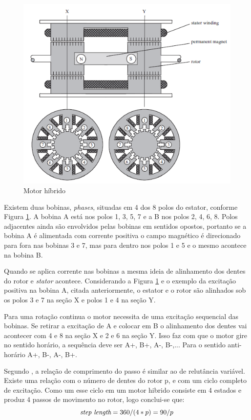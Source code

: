 \begin{figure}[htp]
	\centering
	\includegraphics[scale=0.7]{images/hibrido.png}
	\caption{Motor híbrido}	
	\label{fig:hibrido}	
\end{figure}

Existem duas bobinas, \emph{phases}, situadas em 4 dos 8 polos do estator, conforme Figura \ref{fig:hibrido}. A bobina A está nos polos 1, 3, 5, 7 e a B nos polos 2, 4, 6, 8. Polos adjacentes ainda são envolvidos pelas bobinas em sentidos opostos, portanto se a bobina A é alimentada com corrente positiva o campo magnético é direcionado para fora nas bobinas 3 e 7, mas para dentro nos polos 1 e 5 e o mesmo acontece na bobina B.

Quando se aplica corrente nas bobinas a mesma ideia de alinhamento dos dentes do rotor e \emph{stator} acontece. Considerando a Figura \ref{fig:hibrido} e o exemplo da excitação positiva na bobina A, citada anteriormente, o estator e o rotor são alinhados sob os polos 3 e 7 na seção X e polos 1 e 4 na seção Y.

Para uma rotação continua o motor necessita de uma excitação sequencial das bobinas. Se retirar a excitação de A e colocar em B o alinhamento dos dentes vai acontecer com 4 e 8 na seção X e 2 e 6 na seção Y. Isso faz com que o motor gire no sentido horário, a sequência deve ser A+, B+, A-, B-,... Para o sentido anti-horário A+, B-, A-, B+.

Segundo \cite{acarnley2002stepping}, a relação de comprimento do passo é similar ao de relutância variável. Existe uma relação com o número de dentes do rotor p, e com um ciclo completo de excitação. Como um esse ciclo em um motor hibrido consiste em 4 estados e produz 4 passos de movimento no rotor, logo conclui-se que:
\begin{equation}
  \emph{step length} = 360/(4 * p) = 90 / p
\end{equation}

